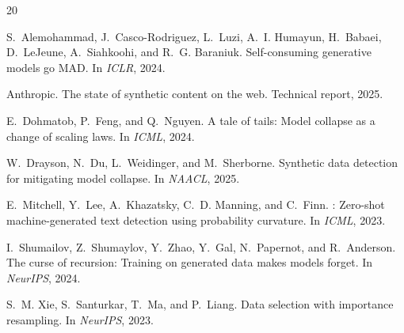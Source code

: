 \documentclass[11pt,a4paper]{article}
\begin{document}

\begin{thebibliography}{20}

S.~Alemohammad, J.~Casco-Rodriguez, L.~Luzi, A.~I. Humayun, H.~Babaei, D.~LeJeune, A.~Siahkoohi, and R.~G. Baraniuk.
\newblock Self-consuming generative models go MAD.
\newblock In \emph{ICLR}, 2024.

Anthropic.
\newblock The state of synthetic content on the web.
\newblock Technical report, 2025.

E.~Dohmatob, P.~Feng, and Q.~Nguyen.
\newblock A tale of tails: Model collapse as a change of scaling laws.
\newblock In \emph{ICML}, 2024.

W.~Drayson, N.~Du, L.~Weidinger, and M.~Sherborne.
\newblock Synthetic data detection for mitigating model collapse.
\newblock In \emph{NAACL}, 2025.

E.~Mitchell, Y.~Lee, A.~Khazatsky, C.~D. Manning, and C.~Finn.
: Zero-shot machine-generated text detection using probability curvature.
\newblock In \emph{ICML}, 2023.

I.~Shumailov, Z.~Shumaylov, Y.~Zhao, Y.~Gal, N.~Papernot, and R.~Anderson.
\newblock The curse of recursion: Training on generated data makes models forget.
\newblock In \emph{NeurIPS}, 2024.

S.~M. Xie, S.~Santurkar, T.~Ma, and P.~Liang.
\newblock Data selection with importance resampling.
\newblock In \emph{NeurIPS}, 2023.

\end{thebibliography}
\end{document}
